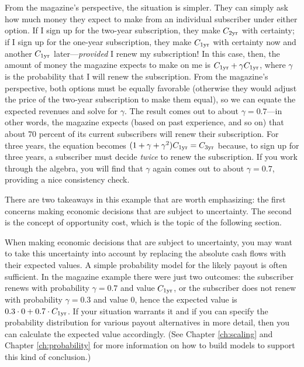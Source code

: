 From the magazine's perspective, the situation is simpler. They can
simply ask how much money they expect to make from an individual
subscriber under either option. If I sign up for the two-year
subscription, they make $C_{{\rm 2yr}}$ with certainty; if I sign up
for the one-year subscription, they make $C_{{\rm 1yr}}$ with
certainty now and another $C_{{\rm 1yr}}$ later---\emph{provided} I
renew my subscription! In this case, then, the amount of money the
magazine expects to make on me is $C_{{\rm 1yr}} + \gamma
C_{{\rm 1yr}}$, where $\gamma$ is the probability that I will renew
the subscription. From the magazine's perspective, both options must
be equally favorable (otherwise they would adjust the price of the
two-year subscription to make them equal), so we can equate the
expected revenues and solve for $\gamma$. The result comes out to
about $\gamma = 0.7$---in other words, the magazine expects (based on
past experience, and so on) that about 70 percent of its current
subscribers will renew their subscription. For three years, the
equation becomes $( 1 + \gamma + \gamma^2) C_{{\rm 1yr}} =
C_{{\rm 3yr}}$ because, to sign up for three years, a subscriber must
decide \emph{twice} to renew the subscription. If you work through the
algebra, you will find that $\gamma$ again comes out to about $\gamma
= 0.7$, providing a nice consistency check.

There are two takeaways in this example that are worth emphasizing:
the first concerns making economic decisions that are subject to
uncertainty. The second is the concept of opportunity cost, which is
the topic of the following section.

When making economic decisions that are subject to uncertainty, you
may want to take this uncertainty into account by replacing the
absolute cash flows with their expected values. A simple probability
model for the likely payout is often sufficient.  In the magazine
example there were just two outcomes: the subscriber renews with
probability $\gamma = 0.7$ and value $C_{{\rm 1yr}}$, or the
subscriber does not renew with probability $\gamma = 0.3$ and value
$0$, hence the expected value is $0.3 \cdot 0 + 0.7 \cdot
C_{{\rm 1yr}}$. If your situation warrants it and if you can specify
the probability distribution for various payout alternatives in more
detail, then you can calculate the expected value accordingly. (See
Chapter \ref{ch:scaling} and Chapter \ref{ch:probability} for more
information on how to build models to support this kind of
conclusion.)

    
